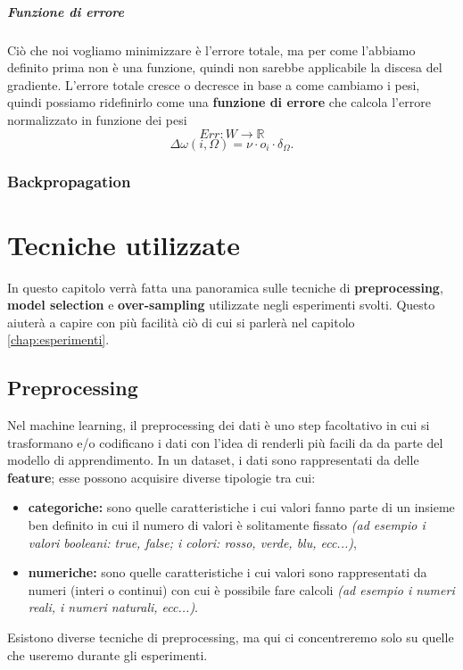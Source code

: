 \documentclass[12pt, twoside, letterpaper]{report}
\begin{document}
				 
				 \paragraph{Funzione di errore} Ciò che noi vogliamo minimizzare è l'errore totale, ma per come l'abbiamo definito prima non è una funzione, quindi non sarebbe applicabile la discesa del gradiente. L'errore totale cresce o decresce in base a come cambiamo i pesi, quindi possiamo ridefinirlo come una \textbf{funzione di errore} che calcola l'errore normalizzato in funzione dei pesi $$Err : W \rightarrow \mathbb{R}$$ 
				 $$\Delta \omega(i,\Omega) = \nu \cdot o_i \cdot \delta_{\Omega}.$$
			\subsection{Backpropagation}
				
				
	\chapter{Tecniche utilizzate}
		In questo capitolo verrà fatta una panoramica sulle tecniche di \textbf{preprocessing}, \textbf{model selection} e \textbf{over-sampling} utilizzate negli esperimenti svolti. Questo aiuterà a capire con più facilità ciò di cui si parlerà nel capitolo \ref{chap:esperimenti}.
		\section{Preprocessing}
			Nel machine learning, il preprocessing dei dati è uno step facoltativo in cui si trasformano e/o codificano i dati con l'idea di renderli più facili da  da parte del modello di apprendimento. In un dataset, i dati sono rappresentati da delle \textbf{feature}; esse possono acquisire diverse tipologie tra cui: 
			
			\begin{itemize}
				\item \textbf{categoriche:} sono quelle caratteristiche i cui valori fanno parte di un insieme ben definito in cui il numero di valori è solitamente fissato \textit{(ad esempio i valori booleani: true, false; i colori: rosso, verde, blu, ecc...)},
				\item \textbf{numeriche:} sono quelle caratteristiche i cui valori sono rappresentati da numeri (interi o continui) con cui è possibile fare calcoli \textit{(ad esempio i numeri reali, i numeri naturali, ecc...)}.
			\end{itemize}
			Esistono diverse tecniche di preprocessing, ma qui ci concentreremo solo su quelle che useremo durante gli esperimenti.
			
\end{document}
